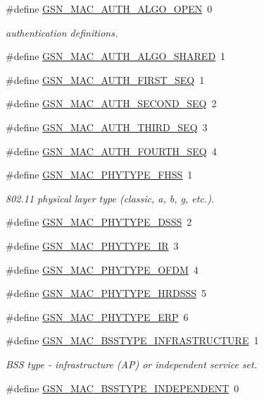 \begin{DoxyCompactItemize}
\item 
\#define \hyperlink{a00642_gacd47816d50e57aeb3b85dfdedc358f68}{GSN\_\-MAC\_\-AUTH\_\-ALGO\_\-OPEN}~0
\begin{DoxyCompactList}\small\item\em authentication definitions. \end{DoxyCompactList}\item 
\#define \hyperlink{a00642_gaed7a52fc252b37b7c3959abe9f1ae41d}{GSN\_\-MAC\_\-AUTH\_\-ALGO\_\-SHARED}~1
\item 
\#define \hyperlink{a00642_gaef1305dd2c4b1cf097722788e2c1ee57}{GSN\_\-MAC\_\-AUTH\_\-FIRST\_\-SEQ}~1
\item 
\#define \hyperlink{a00642_ga57052f7661d88b214bdd95c8813cf7ab}{GSN\_\-MAC\_\-AUTH\_\-SECOND\_\-SEQ}~2
\item 
\#define \hyperlink{a00642_ga9dacfef47d27c883bff514e485ef2e56}{GSN\_\-MAC\_\-AUTH\_\-THIRD\_\-SEQ}~3
\item 
\#define \hyperlink{a00642_ga6c6855fb6717e3e7dbf0015697bb75a2}{GSN\_\-MAC\_\-AUTH\_\-FOURTH\_\-SEQ}~4
\end{DoxyCompactItemize}
\begin{DoxyCompactItemize}
\item 
\#define \hyperlink{a00642_ga53bbc17ad8f0c2d8481cd07a300a9640}{GSN\_\-MAC\_\-PHYTYPE\_\-FHSS}~1
\begin{DoxyCompactList}\small\item\em 802.11 physical layer type (classic, a, b, g, etc.). \end{DoxyCompactList}\item 
\#define \hyperlink{a00642_gaea4417ed84d382fcaec29ef522d491af}{GSN\_\-MAC\_\-PHYTYPE\_\-DSSS}~2
\item 
\#define \hyperlink{a00642_ga0c7253eeef7a0f2a018c4b1436bc584d}{GSN\_\-MAC\_\-PHYTYPE\_\-IR}~3
\item 
\#define \hyperlink{a00642_ga23cddc9f0e4001a0b73f391e92df0302}{GSN\_\-MAC\_\-PHYTYPE\_\-OFDM}~4
\item 
\#define \hyperlink{a00642_ga86c7ded9f98a88e0d0b6e1f8c3c710a9}{GSN\_\-MAC\_\-PHYTYPE\_\-HRDSSS}~5
\item 
\#define \hyperlink{a00642_ga1bef034ba2995a95023a571a00b85b9a}{GSN\_\-MAC\_\-PHYTYPE\_\-ERP}~6
\end{DoxyCompactItemize}
\begin{DoxyCompactItemize}
\item 
\#define \hyperlink{a00642_ga2372fc9534269f16c2e02d4c02bd9678}{GSN\_\-MAC\_\-BSSTYPE\_\-INFRASTRUCTURE}~1
\begin{DoxyCompactList}\small\item\em BSS type -\/ infrastructure (AP) or independent service set. \end{DoxyCompactList}\item 
\#define \hyperlink{a00642_ga87bb2904a9980d0ecf8f90a9def53f8b}{GSN\_\-MAC\_\-BSSTYPE\_\-INDEPENDENT}~0
\end{DoxyCompactItemize}
